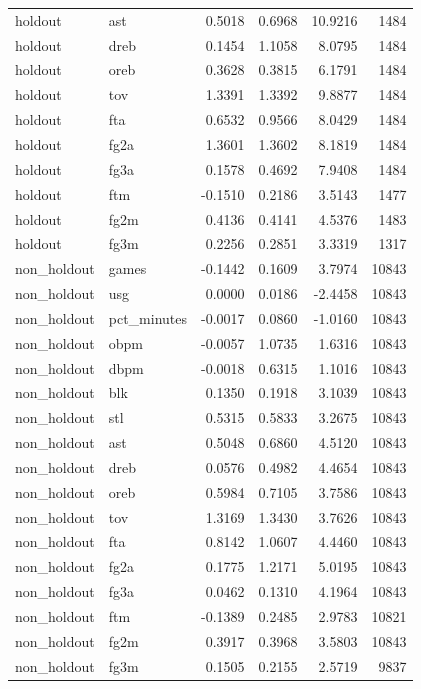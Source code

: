 \begin{table}
\begin{tabular}{llrrrr}
holdout & ast & 0.5018 & 0.6968 & 10.9216 & 1484 \\
holdout & dreb & 0.1454 & 1.1058 & 8.0795 & 1484 \\
holdout & oreb & 0.3628 & 0.3815 & 6.1791 & 1484 \\
holdout & tov & 1.3391 & 1.3392 & 9.8877 & 1484 \\
holdout & fta & 0.6532 & 0.9566 & 8.0429 & 1484 \\
holdout & fg2a & 1.3601 & 1.3602 & 8.1819 & 1484 \\
holdout & fg3a & 0.1578 & 0.4692 & 7.9408 & 1484 \\
holdout & ftm & -0.1510 & 0.2186 & 3.5143 & 1477 \\
holdout & fg2m & 0.4136 & 0.4141 & 4.5376 & 1483 \\
holdout & fg3m & 0.2256 & 0.2851 & 3.3319 & 1317 \\
non\_holdout & games & -0.1442 & 0.1609 & 3.7974 & 10843 \\
non\_holdout & usg & 0.0000 & 0.0186 & -2.4458 & 10843 \\
non\_holdout & pct\_minutes & -0.0017 & 0.0860 & -1.0160 & 10843 \\
non\_holdout & obpm & -0.0057 & 1.0735 & 1.6316 & 10843 \\
non\_holdout & dbpm & -0.0018 & 0.6315 & 1.1016 & 10843 \\
non\_holdout & blk & 0.1350 & 0.1918 & 3.1039 & 10843 \\
non\_holdout & stl & 0.5315 & 0.5833 & 3.2675 & 10843 \\
non\_holdout & ast & 0.5048 & 0.6860 & 4.5120 & 10843 \\
non\_holdout & dreb & 0.0576 & 0.4982 & 4.4654 & 10843 \\
non\_holdout & oreb & 0.5984 & 0.7105 & 3.7586 & 10843 \\
non\_holdout & tov & 1.3169 & 1.3430 & 3.7626 & 10843 \\
non\_holdout & fta & 0.8142 & 1.0607 & 4.4460 & 10843 \\
non\_holdout & fg2a & 0.1775 & 1.2171 & 5.0195 & 10843 \\
non\_holdout & fg3a & 0.0462 & 0.1310 & 4.1964 & 10843 \\
non\_holdout & ftm & -0.1389 & 0.2485 & 2.9783 & 10821 \\
non\_holdout & fg2m & 0.3917 & 0.3968 & 3.5803 & 10843 \\
non\_holdout & fg3m & 0.1505 & 0.2155 & 2.5719 & 9837 \\
\bottomrule
\end{tabular}
\end{table}
